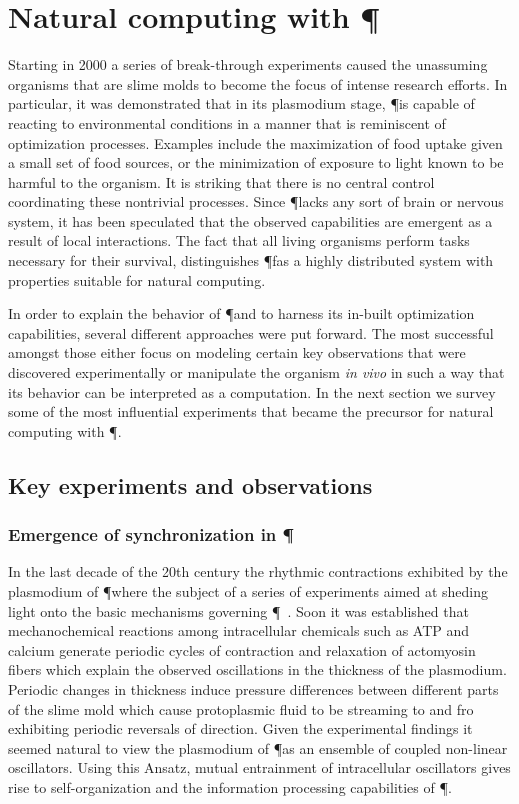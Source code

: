 
\section{Natural computing with \P}

	Starting in 2000 a series of break-through experiments caused the unassuming organisms that are slime molds to become the focus of intense research efforts. In particular, it was demonstrated that in its plasmodium stage, \P is capable of reacting to environmental conditions in a manner that is reminiscent of optimization processes. Examples include the maximization of food uptake given a small set of food sources, or the minimization of exposure to light known to be harmful to the organism. It is striking that there is no central control coordinating these nontrivial processes. Since \P lacks any sort of brain or nervous system, it has been speculated that the observed capabilities are emergent as a result of local interactions. The fact that all living organisms perform tasks necessary for their survival, distinguishes \P fas a highly distributed system with properties suitable for natural computing.

	In order to explain the behavior of \P and to harness its in-built optimization capabilities, several different approaches were put forward. The most successful amongst those either focus on modeling certain key observations that were discovered experimentally or manipulate the organism \textit{in vivo} in such a way that its behavior can be interpreted as a computation. In the next section we survey some of the most influential experiments that became the precursor for natural computing with \P.

	\subsection{Key experiments and observations}

		\subsubsection{Emergence of synchronization in \P }
		
			In the last decade of the 20th century the rhythmic contractions exhibited by the plasmodium of \P where the subject of a series of experiments aimed at sheding light onto the basic mechanisms governing \P~\cite{MIYAKE1996341,NAKAGAKI1996261,TAKAHASHI1997105}. Soon it was established that mechanochemical reactions among intracellular chemicals such as ATP and calcium generate periodic cycles of contraction and relaxation of actomyosin fibers which explain the observed oscillations in the thickness of the plasmodium. Periodic changes in thickness induce pressure differences between different parts of the slime mold which cause protoplasmic fluid to be streaming to and fro exhibiting periodic reversals of direction. Given the experimental findings it seemed natural to view the plasmodium of \P as an ensemble of coupled non-linear oscillators. Using this Ansatz, mutual entrainment of intracellular oscillators gives rise to self-organization and the information processing capabilities of \P. 

